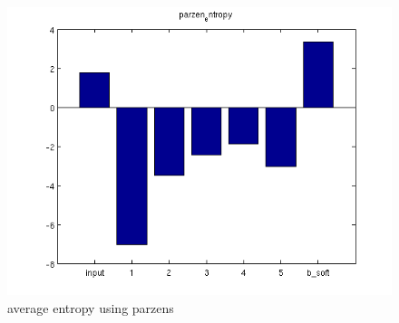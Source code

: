 \documentclass[11pt]{article}
\begin{document}
\begin{figure}[H]
\centering
\includegraphics[scale=0.80]{figs/parzen_entropy.png}
\caption{average entropy using parzens}
\end{figure}

\end{document}

